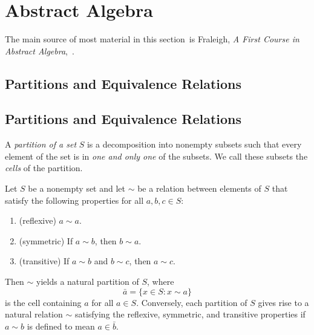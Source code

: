
\pagebreak
\section{Abstract Algebra}
\label{sec:abstr-algebr} 
\def\sectype{section}
The main source of most material in this \sectype\ is Fraleigh, {\it A First
  Course in Abstract Algebra},~\cite{Fraleigh:1994}.  

   {
     \subsection{Partitions and Equivalence Relations}
   }
   {
     \subsection{Partitions and Equivalence Relations\protect\footnotemark}
   }
\label{sec:part-equiv-relat}
\begin{definition}[Partition] 
A \emph{partition of a set} $S$ is a decomposition into nonempty
subsets such that every element of the set is in {\it one and only
one} of the subsets.  We call these subsets the \emph{cells} of the
partition. 
\end{definition}

\begin{theorem}\label{thm:EquivalenceClass}
Let $S$ be a nonempty set and let $\sim$ be a relation between
elements of $S$ that satisfy the following properties for all 
$a,b,c \in S$:
\begin{enumerate}
\item (reflexive) $a\sim a$.
\item (symmetric) If $a\sim b$, then $b\sim a$.
\item (transitive) If $a\sim b$ and $b\sim c$, then $a\sim c$.
\end{enumerate}
Then $\sim$ yields a natural partition of $S$, where
\[
\bar{a} = \{x\in S:x\sim a\}
\]
is the cell containing $a$ for all $a\in S$.  Conversely, each
partition of $S$ gives rise to a natural relation $\sim$ satisfying
the reflexive, symmetric, and transitive properties if $a\sim b$ is
defined to mean $a\in \bar{b}$.
\end{theorem}

